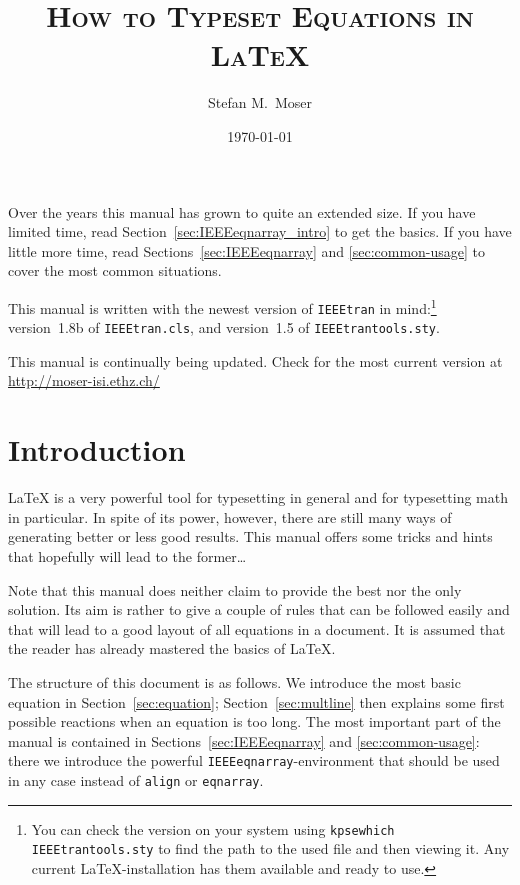 \documentclass[a4paper,11pt]{article}
\title{\textsc{How to Typeset Equations in \LaTeX{}}}
\author{Stefan M.~Moser}
\date{\today\\\version}
\begin{document}
\maketitle

\tableofcontents


\bigskip
\bigskip

Over the years this manual has grown to quite an extended size.  If
you have limited time, read Section~\ref{sec:IEEEeqnarray_intro} to
get the basics.  If you have little more time, read
Sections~\ref{sec:IEEEeqnarray} and \ref{sec:common-usage} to cover
the most common situations.

This manual is written with the newest version of \verb+IEEEtran+ in
mind:\footnote{You can check the version on your system using
  \texttt{kpsewhich IEEEtrantools.sty} to find the path to the used
  file and then viewing it. Any current \LaTeX{}-installation has them
  available and ready to use.} version~1.8b of \verb+IEEEtran.cls+,
and version~1.5 of \verb+IEEEtrantools.sty+.

This manual is continually being updated. Check for the most current
version at \url{http://moser-isi.ethz.ch/}

\section{Introduction}
\label{sec:introduction}

\LaTeX{} is a very powerful tool for typesetting in general and for
typesetting math in particular. In spite of its power, however, there
are still many ways of generating better or less good results.  This
manual offers some tricks and hints that hopefully will lead to the
former\ldots

Note that this manual does neither claim to provide the best nor the
only solution. Its aim is rather to give a couple of rules that can be
followed easily and that will lead to a good layout of all equations
in a document. It is assumed that the reader has already mastered the
basics of \LaTeX{}.

The structure of this document is as follows. We introduce the most
basic equation in Section~\ref{sec:equation};
Section~\ref{sec:multline} then explains some first possible reactions
when an equation is too long.  The most important part of the manual
is contained in Sections~\ref{sec:IEEEeqnarray} and
\ref{sec:common-usage}: there we introduce the powerful
\verb+IEEEeqnarray+-environment that should be used in any case
instead of \verb+align+ or \verb+eqnarray+.
\end{document}
